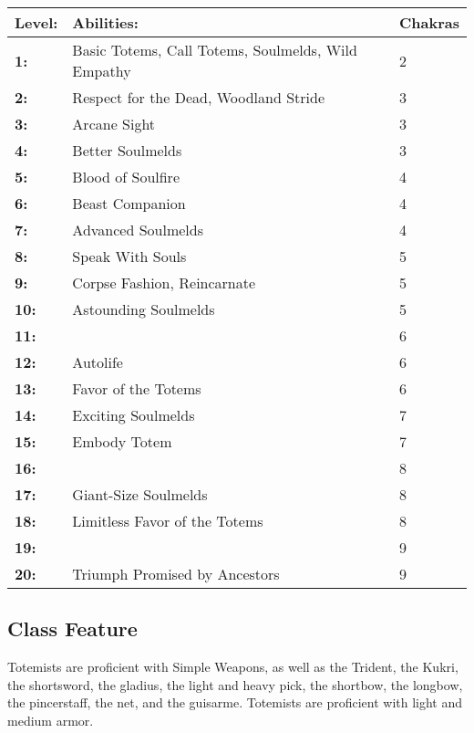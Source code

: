 \noindent\begin{tabular}[h]{|l|l|l|}
\hline
\textbf{Level:}&\textbf{Abilities:}&\textbf{Chakras}\\
\hline
\textbf{1:}&Basic Totems, Call Totems, Soulmelds, Wild Empathy&2\\
\hline
\textbf{2:}&Respect for the Dead, Woodland Stride&3\\
\hline
\textbf{3:}&Arcane Sight&3\\
\hline
\textbf{4:}&Better Soulmelds&3\\
\hline
\textbf{5:}&Blood of Soulfire&4\\
\hline
\textbf{6:}&Beast Companion&4\\
\hline
\textbf{7:}&Advanced Soulmelds&4\\
\hline
\textbf{8:}&Speak With Souls&5\\
\hline
\textbf{9:}&Corpse Fashion, Reincarnate&5\\
\hline
\textbf{10:}&Astounding Soulmelds&5\\
\hline
\textbf{11:}&&6\\
\hline
\textbf{12:}&Autolife&6\\
\hline
\textbf{13:}&Favor of the Totems&6\\
\hline
\textbf{14:}&Exciting Soulmelds&7\\
\hline
\textbf{15:}&Embody Totem&7\\
\hline
\textbf{16:}&&8\\
\hline
\textbf{17:}&Giant-Size Soulmelds&8\\
\hline
\textbf{18:}&Limitless Favor of the Totems&8\\
\hline
\textbf{19:}&&9\\
\hline
\textbf{20:}&Triumph Promised by Ancestors&9\\
\hline
\end{tabular}

\subsection*{Class Feature}

 Totemists are proficient with Simple Weapons, as well as the Trident, the Kukri, the shortsword, the gladius, the light and heavy pick, the shortbow, the longbow, the pincerstaff, the net, and the guisarme. Totemists are proficient with light and medium armor.

